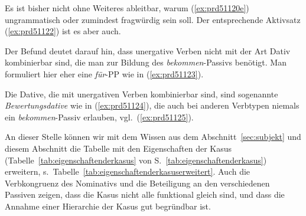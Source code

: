 \begin{exe}
  \ex\label{ex:prd51121} 
  \begin{xlist}
  \end{xlist}
\end{exe}

Es ist bisher nicht ohne Weiteres ableitbar, warum (\ref{ex:prd51120e}) ungrammatisch oder zumindest fragwürdig sein soll.
Der entsprechende Aktivsatz (\ref{ex:prd51122}) ist es aber auch.

\begin{exe}
\end{exe}


Der Befund deutet darauf hin, dass unergative Verben nicht mit der Art Dativ kombinierbar sind, die man zur Bildung des \textit{bekommen}-Passivs benötigt.
Man formuliert hier eher eine \textit{für}-PP wie in (\ref{ex:prd51123}).

\begin{exe}
\end{exe}

Die Dative, die mit unergativen Verben kombinierbar sind, sind sogenannte \textit{Bewertungsdative} wie in (\ref{ex:prd51124}), die auch bei anderen Verbtypen niemals ein \textit{bekommen}-Passiv erlauben, vgl.\ (\ref{ex:prd51125}).

\begin{exe}
  \ex\label{ex:prd51124} 
  \begin{xlist}
  \end{xlist}
  \ex\label{ex:prd51125} 
  \begin{xlist}
  \end{xlist}
\end{exe}

An dieser Stelle können wir mit dem Wissen aus dem Abschnitt~\ref{sec:subjekt} und diesem Abschnitt die Tabelle mit den Eigenschaften der Kasus (Tabelle~\ref{tab:eigenschaftenderkasus} von S.~\ref{tab:eigenschaftenderkasus}) erweitern, s.\ Tabelle~\ref{tab:eigenschaftenderkasuserweitert}.
Auch die Verbkongruenz des Nominativs und die Beteiligung an den verschiedenen Passiven zeigen, dass die Kasus nicht alle funktional gleich sind, und dass die Annahme einer Hierarchie der Kasus gut begründbar ist.

